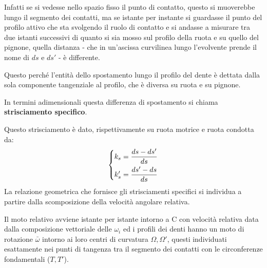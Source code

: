 \documentclass[a4paper, 15pt]{article}
\begin{document}
\begin{adjustwidth}{2in}{}
	Infatti se si vedesse nello spazio fisso il punto di contatto, questo si muoverebbe lungo il segmento dei contatti, ma se istante per instante si guardasse il punto del profilo attivo che sta svolgendo il ruolo di contatto e si andasse a misurare tra due istanti successivi di quanto si sia mosso sul profilo della ruota e su quello del pignone, quella distanza - che in un'ascissa curvilinea lungo l'evolvente prende il nome di $ds$ e $ds'$ -  è differente.
	
	Questo perché l'entità dello spostamento lungo il profilo del dente è dettata dalla sola componente tangenziale al profilo, che è diversa su ruota e su pignone. 
	
	In termini adimensionali questa differenza di spostamento si chiama \textbf{strisciamento specifico}. \newline
	
	Questo strisciamento è dato, rispettivamente su ruota motrice e ruota condotta da: 
	\[\begin{dcases}
		k_s  = \dfrac{ds-ds'}{ds} \\
		k_s' = \dfrac{ds'- ds}{ds}
	\end{dcases}\]
	La relazione geometrica che fornisce gli strisciamenti specifici si individua a partire dalla scomposizione della velocità angolare relativa. 
	
	Il moto relativo avviene istante per istante intorno a C con velocità relativa data dalla composizione vettoriale delle $\omega_i$ ed i profili dei denti hanno un moto di rotazione $\bar{\omega}$ intorno ai loro centri di curvatura $\Omega, \Omega'$, questi individuati esattamente nei punti di tangenza tra il segmento dei contatti con le circonferenze fondamentali ($T, T'$). 
	

\end{adjustwidth}
\end{document}
